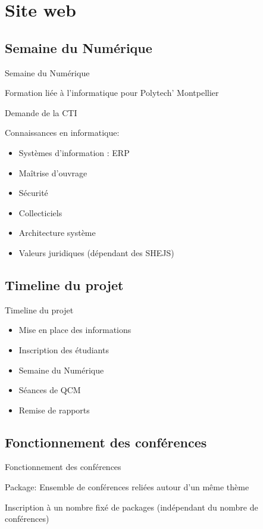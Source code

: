 \section{Site web}

\subsection{Semaine du Numérique}
\begin{frame}{Semaine du Numérique}

    Formation liée à l'informatique pour Polytech' Montpellier

    Demande de la CTI

    Connaissances en informatique:
    \begin{itemize}
    \item Systèmes d’information : ERP
    \item Maîtrise d’ouvrage
    \item Sécurité
    \item Collecticiels
    \item Architecture système
    \item Valeurs juridiques (dépendant des SHEJS)
    \end{itemize}

\end{frame}

\subsection{Timeline du projet}
\begin{frame}{Timeline du projet}

    \begin{itemize}
    \item Mise en place des informations
    \item Inscription des étudiants
    \item Semaine du Numérique
    \item Séances de QCM
    \item Remise de rapports
    \end{itemize}

\end{frame}

\subsection{Fonctionnement des conférences}
\begin{frame}{Fonctionnement des conférences}

    Package: Ensemble de conférences reliées autour d'un même thème

    Inscription à un nombre fixé de packages (indépendant du nombre de conférences)

\end{frame}

